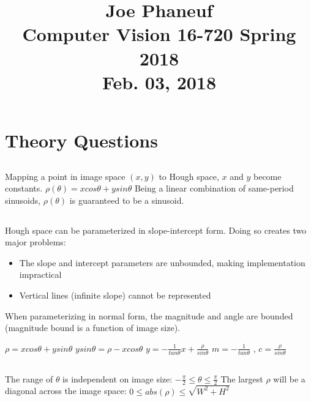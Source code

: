 \documentclass[12pt]{article}
\begin{document}
\title{Joe Phaneuf \\ Computer Vision 16-720 Spring 2018 \\ Feb. 03, 2018 }
\date{}
\author{}
\maketitle

\newpage


\section{Theory Questions}

\subsection{}
Mapping a point in image space $(x,y)$ to Hough space, $x$ and $y$ become constants.  
$\rho(\theta) = x cos \theta + y sin \theta$  
Being a linear combination of same-period sinusoids, $\rho(\theta)$ is guaranteed to be a sinusoid.  

\newpage
\subsection{}
Hough space can be parameterized in slope-intercept form.  
Doing so creates two major problems:  

\begin{itemize}
\item The slope and intercept parameters are unbounded, making implementation impractical
\item Vertical lines (infinite slope) cannot be represented 
\end{itemize}


When parameterizing in normal form, the magnitude and angle are bounded (magnitude bound is a function of image size).

$\rho = x cos \theta + y sin \theta$  
$y sin \theta = \rho - x cos \theta$  
$y = - \frac{1}{tan \theta} x + \frac{\rho}{sin \theta}$  
$m =- \frac{1}{tan \theta}$ , $c = \frac{\rho}{sin \theta}$  

\newpage
\subsection{}
The range of $\theta$ is independent on image size: $- \frac{\pi}{2} \leq \theta \leq \frac{\pi}{2}$  
The largest $\rho$ will be a diagonal across the image space: $0 \leq abs(\rho) \leq \sqrt{W^{2} + H^{2}}$
\end{document}
